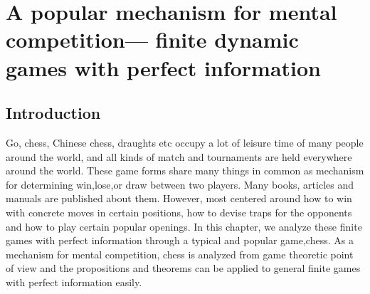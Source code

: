 
\chapter{A popular mechanism for mental competition--- finite dynamic games with perfect information}  %

\label{Chapter5} %



\section{Introduction}
 Go, chess, Chinese chess, draughts etc occupy a lot of leisure time of many people around the world, and all kinds of match and tournaments are held everywhere around the world. 
 These game forms share many things in common as mechanism for determining win,lose,or draw between two players.
 Many books, articles and manuals are published about them. However, most centered around how to win with concrete moves in certain positions, how to devise traps for the opponents and how to 
 play certain popular openings. In this chapter, we analyze these finite games with perfect information through a typical and popular game,chess. 
 As a mechanism for mental competition, chess is analyzed from game theoretic point of view and the propositions and theorems can be applied to general finite games with perfect information easily.

